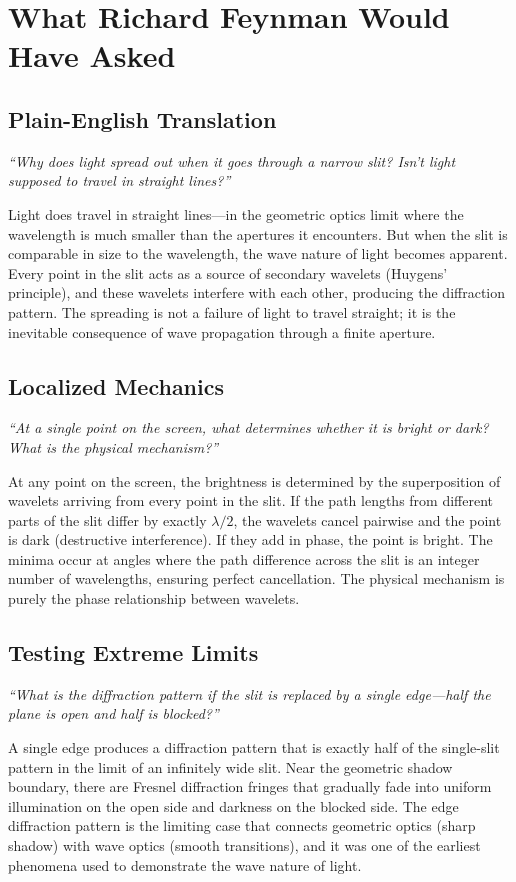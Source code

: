 \section*{What Richard Feynman Would Have Asked}

\subsection*{Plain-English Translation}
\textit{``Why does light spread out when it goes through a narrow slit? Isn't light supposed to travel in straight lines?''}

Light does travel in straight lines---in the geometric optics limit where the wavelength is much smaller than the apertures it encounters. But when the slit is comparable in size to the wavelength, the wave nature of light becomes apparent. Every point in the slit acts as a source of secondary wavelets (Huygens' principle), and these wavelets interfere with each other, producing the diffraction pattern. The spreading is not a failure of light to travel straight; it is the inevitable consequence of wave propagation through a finite aperture.

\subsection*{Localized Mechanics}
\textit{``At a single point on the screen, what determines whether it is bright or dark? What is the physical mechanism?''}

At any point on the screen, the brightness is determined by the superposition of wavelets arriving from every point in the slit. If the path lengths from different parts of the slit differ by exactly $\lambda/2$, the wavelets cancel pairwise and the point is dark (destructive interference). If they add in phase, the point is bright. The minima occur at angles where the path difference across the slit is an integer number of wavelengths, ensuring perfect cancellation. The physical mechanism is purely the phase relationship between wavelets.

\subsection*{Testing Extreme Limits}
\textit{``What is the diffraction pattern if the slit is replaced by a single edge---half the plane is open and half is blocked?''}

A single edge produces a diffraction pattern that is exactly half of the single-slit pattern in the limit of an infinitely wide slit. Near the geometric shadow boundary, there are Fresnel diffraction fringes that gradually fade into uniform illumination on the open side and darkness on the blocked side. The edge diffraction pattern is the limiting case that connects geometric optics (sharp shadow) with wave optics (smooth transitions), and it was one of the earliest phenomena used to demonstrate the wave nature of light.


